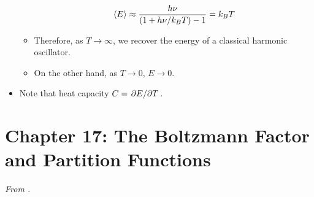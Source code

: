 \documentclass[../notes.tex]{subfiles}
\begin{document}
\begin{itemize}
\begin{itemize}
        \begin{equation*}
            \left\langle{E}\right\rangle \approx \frac{h\nu}{(1+h\nu/k_BT)-1} = k_BT
        \end{equation*}
        \item Therefore, as $T\to\infty$, we recover the energy of a classical harmonic oscillator.
        \item On the other hand, as $T\to 0$, $E\to 0$.
    \end{itemize}
    \item Note that heat capacity $C=\pdv*{E}{T}$.
\end{itemize}



\section{Chapter 17: The Boltzmann Factor and Partition Functions}
\emph{From \textcite{bib:McQuarrieSimon}.}
\end{document}
